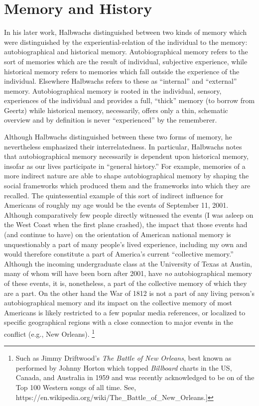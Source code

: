 \hypertarget{memory-and-history}{%
\section{Memory and History}\label{memory-and-history}}

In his later work, Halbwachs distinguished between two kinds of memory
which were distinguished by the experiential-relation of the individual
to the memory: autobiographical and historical
memory.\autocite[52]{halbwachs1980} Autobiographical memory refers to
the sort of memories which are the result of individual, subjective
experience, while historical memory refers to memories which fall
outside the experience of the individual. Elsewhere Halbwachs refers to
these as ``internal'' and ``external'' memory. Autobiographical memory
is rooted in the individual, sensory, experiences of the individual and
provides a full, ``thick'' memory (to borrow from Geertz) while
historical memory, necessarily, offers only a thin, schematic overview
and by definition is never ``experienced'' by the rememberer.

Although Halbwachs distinguished between these two forms of memory, he
nevertheless emphasized their interrelatedness. In particular, Halbwachs
notes that autobiographical memory necessarily is dependent upon
historical memory, insofar as our lives participate in ``general
history.''\autocite[52]{halbwachs1980} For example, memories of a more
indirect nature are able to shape autobiographical memory by shaping the
social frameworks which produced them and the frameworks into which they
are recalled. The quintessential example of this sort of indirect
influence for Americans of roughly my age would be the events of
September 11, 2001. Although comparatively few people directly witnessed
the events (I was asleep on the West Coast when the first plane
crashed), the impact that those events had (and continue to have) on the
orientation of American national memory is unquestionably a part of many
people's lived experience, including my own and would therefore
constitute a part of America's current ``collective memory.'' Although
the incoming undergraduate class at the University of Texas at Austin,
many of whom will have been born after 2001, have \emph{no}
autobiographical memory of these events, it is, nonetheless, a part of
the collective memory of which they are a part. On the other hand the
War of 1812 is not a part of any living person's autobiographical memory
and its impact on the collective memory of most Americans is likely
restricted to a few popular media references, or localized to specific
geographical regions with a close connection to major events in the
conflict (e.g., New Orleans). \footnote{Such as Jimmy Driftwood's
  \emph{The Battle of New Orleans}, best known as performed by Johnny
  Horton which topped \emph{Billboard} charts in the US, Canada, and
  Australia in 1959 and was recently acknowledged to be on of the Top
  100 Western songs of all time. See,
  https://en.wikipedia.org/wiki/The\_Battle\_of\_New\_Orleans.{]}}

